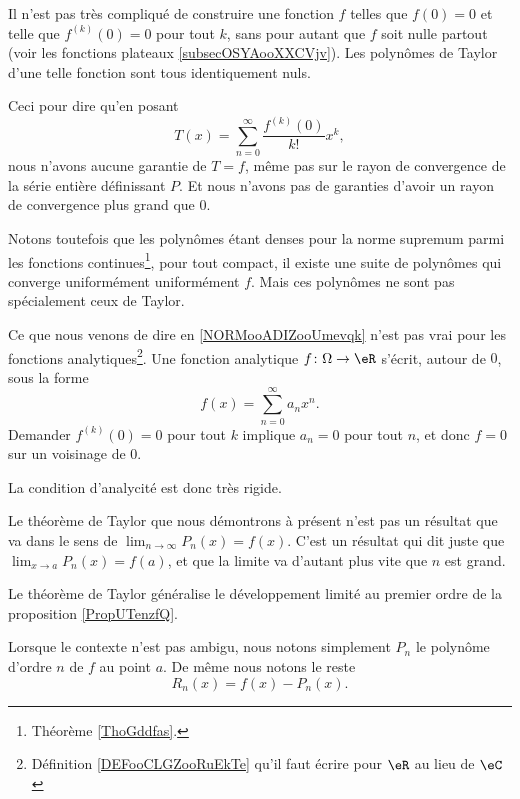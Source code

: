 \begin{normaltext}      \label{NORMooADIZooUmevqk}
	Il n'est pas très compliqué de construire une fonction \( f\) telles que \( f(0)=0\) et telle que \( f^{(k)}(0)=0\) pour tout \( k\), sans pour autant que \( f\) soit nulle partout (voir les fonctions plateaux \ref{subsecOSYAooXXCVjv}). Les polynômes de Taylor d'une telle fonction sont tous identiquement nuls.

	Ceci pour dire qu'en posant
	\begin{equation}
		T(x)=\sum_{n=0}^{\infty}\frac{ f^{(k)}(0) }{ k! }x^k,
	\end{equation}
	nous n'avons aucune garantie de \( T=f\), même pas sur le rayon de convergence de la série entière définissant \( P\). Et nous n'avons pas de garanties d'avoir un rayon de convergence plus grand que \( 0\).

	Notons toutefois que les polynômes étant denses pour la norme supremum parmi les fonctions continues\footnote{Théorème \ref{ThoGddfas}.}, pour tout compact, il existe une suite de polynômes qui converge uniformément uniformément \( f\). Mais ces polynômes ne sont pas spécialement ceux de Taylor.
\end{normaltext}

\begin{normaltext}
	Ce que nous venons de dire en \ref{NORMooADIZooUmevqk} n'est pas vrai pour les fonctions analytiques\footnote{Définition \ref{DEFooCLGZooRuEkTe} qu'il faut écrire pour \( \eR\) au lieu de \( \eC\)}. Une fonction analytique \( f\colon \Omega\to \eR\) s'écrit, autour de \( 0\), sous la forme
	\begin{equation}
		f(x)=\sum_{n=0}^{\infty}a_nx^n.
	\end{equation}
	Demander \( f^{(k)}(0)=0\) pour tout \( k\) implique \( a_n=0\) pour tout \( n\), et donc \( f=0\) sur un voisinage de \( 0\).

	La condition d'analycité est donc très rigide.
\end{normaltext}

Le théorème de Taylor que nous démontrons à présent n'est pas un résultat que va dans le sens de \( \lim_{n\to \infty} P_n(x)=f(x)\). C'est un résultat qui dit juste que \( \lim_{x\to a} P_n(x)=f(a)\), et que la limite va d'autant plus vite que \( n\) est grand.

Le théorème de Taylor généralise le développement limité au premier ordre de la proposition \ref{PropUTenzfQ}.

\begin{normaltext}
	Lorsque le contexte n'est pas ambigu, nous notons simplement \( P_n\) le polynôme d'ordre \( n\) de \( f\) au point \( a\). De même nous notons le reste
	\begin{equation}
		R_n(x)=f(x)-P_n(x).
	\end{equation}
\end{normaltext}

